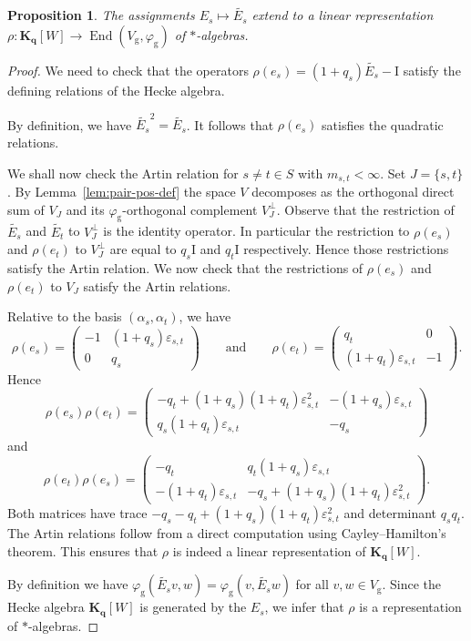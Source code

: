 \documentclass[12pt,a4paper]{amsproc}
\newtheorem{proposition}[theorem]{Proposition}
\theoremstyle{definition}
\DeclareMathOperator{\End}{End}
\newcommand{\KK}{\mathbf K}
\begin{document}
\begin{proposition}\label{prop:geometric-Hecke}
The assignments $E_s \mapsto  \widetilde{E_s}$ extend to a linear representation $\rho \colon \KK_{\mathbf q}[W] \to \End(V_{\mathrm g}, \varphi_{\mathrm g})$ of $*$-algebras. 
\end{proposition}



\begin{proof} 
We need to check that the operators $\rho(e_s) = (1+q_s)   \widetilde{E_s} - \mathrm{I}$ satisfy the defining  relations of the Hecke algebra. 

By definition, we have $ \widetilde{E_s}^2 =  \widetilde{E_s}$. It follows that $\rho(e_s)$ satisfies the quadratic relations. 

We shall now check the Artin relation for $s \neq t \in S$ with $m_{s, t} < \infty$. Set $J = \{s, t\}$. By Lemma~\ref{lem:pair-pos-def} the space $V$ decomposes as the orthogonal direct sum of $V_J$ and its $\varphi_{\mathrm g}$-orthogonal complement $V_J^\perp$. Observe that the restriction of $\widetilde{E_s}$ and $\widetilde{E_t}$ to $V_J^\perp$ is the identity operator. In particular the restriction to $\rho(e_s)$  and $\rho(e_t)$ to $V_J^\perp$ are equal to $q_s \mathrm{I}$ and $q_t \mathrm{I}$ respectively. Hence those restrictions satisfy the Artin relation. We now check that the restrictions of $\rho(e_s)$  and $\rho(e_t)$  to $V_J$ satisfy the Artin relations. 

Relative to the basis $(\alpha_s, \alpha_t)$, we have 
$$\rho(e_s) = \left(\begin{matrix}
-1 & (1+q_s)\varepsilon_{s, t}\\
0 & q_s
\end{matrix}\right) 
\qquad \text{and} \qquad
\rho(e_t) = \left(\begin{matrix}
q_t & 0\\
(1+q_t)\varepsilon_{s, t} & -1 
\end{matrix}\right).$$
 Hence
$$\rho(e_s)\rho(e_t) = \left(\begin{matrix}
-q_t + (1+q_s)(1+q_t)\varepsilon_{s, t}^2 &  - (1+q_s)\varepsilon_{s, t}\\
 q_s(1+q_t)\varepsilon_{s, t} & -q_s
\end{matrix}\right) $$
and
$$\rho(e_t)\rho(e_s) = \left(\begin{matrix}
-q_t & q_t(1+q_s)\varepsilon_{s, t}\\
 - (1+q_t)\varepsilon_{s, t}& -q_s + (1+q_s)(1+q_t)\varepsilon_{s, t}^2 
\end{matrix}\right).$$ 
Both matrices have trace $-q_s -q_t + (1+q_s)(1+q_t)\varepsilon_{s, t}^2 $ and determinant $q_s q_t$. The Artin relations follow from a direct computation using Cayley--Hamilton's theorem. This ensures that $\rho $ is indeed a linear representation of $\KK_{\mathbf q}[W]$. 

By definition we have $\varphi_{\mathrm g}(\widetilde{E_s}v, w)= \varphi_{\mathrm g}(v, \widetilde{E_s}w)$ for all $v, w \in  V_{\mathrm g}$. Since the Hecke algebra $\KK_{\mathbf q}[W]$ is generated by the $E_s$, we infer that $\rho$ is a representation of $*$-algebras.
\end{proof}
	
\end{document}

